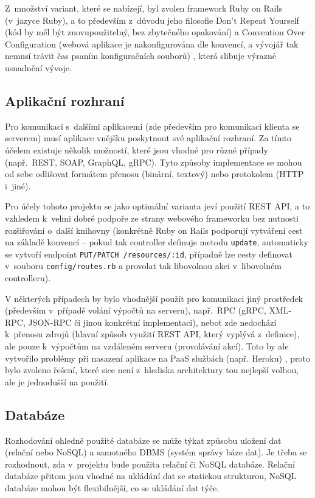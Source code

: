 \documentclass[twoside]{ctuthesis}
\begin{document}
Z~množství variant, které se nabízejí, byl zvolen framework Ruby on Rails (v~jazyce Ruby), a to především z~důvodu jeho filosofie Don't Repeat Yourself (kód by měl být znovupoužitelný, bez zbytečného opakování) a Convention Over Configuration (webová aplikace je nakonfigurována dle konvencí, a vývojář tak nemusí trávit čas psaním konfiguračních souborů) \cite{rails2020}, která slibuje výrazné usnadnění vývoje.

\subsection{Aplikační rozhraní}

Pro komunikaci s~dalšími aplikacemi (zde především pro komunikaci klienta se serverem) musí aplikace vnějšku poskytnout své aplikační rozhraní. Za tímto účelem existuje několik možností, které jsou vhodné pro různé případy (např.~REST, SOAP, GraphQL, gRPC). Tyto způsoby implementace se mohou od sebe odlišovat formátem přenosu (binární, textový) nebo protokolem (HTTP i~jiné).

Pro účely tohoto projektu se jako optimální varianta jeví použití REST API, a to vzhledem k~velmi dobré podpoře ze strany webového frameworku bez nutnosti rozšiřování o~další knihovny (konkrétně Ruby on Rails podporují vytváření cest na základě konvencí – pokud tak controller definuje metodu \texttt{update}, automaticky se vytvoří endpoint \texttt{PUT/PATCH /resources/:id}, případně lze cesty definovat v~souboru \texttt{config/routes.rb} a provolat tak libovolnou akci v~libovolném controlleru).

V některých případech by bylo vhodnější použít pro komunikaci jiný prostředek (především v~případě volání výpočtů na serveru), např.~RPC (gRPC, XML-RPC, JSON-RPC či jinou konkrétní implementaci), neboť zde nedochází k~přenosu zdrojů (hlavní způsob využití REST API, který vyplývá z~definice), ale pouze k~výpočtům na vzdáleném serveru (provolávání akcí). \cite{sturgeon2016understanding} Toto by ale vytvořilo problémy při nasazení aplikace na PaaS službách (např. Heroku) \cite{lisitsky2018does}, proto bylo zvoleno řešení, které sice není z~hlediska architektury tou nejlepší volbou, ale je jednodušší na použití.

\subsection{Databáze}

Rozhodování ohledně použité databáze se může týkat způsobu uložení dat (relační nebo NoSQL) a samotného DBMS (systém správy báze dat). Je třeba se rozhodnout, zda v~projektu bude použita relační či NoSQL databáze. Relační databáze přitom jsou vhodné na ukládání dat se statickou strukturou, NoSQL databáze mohou být flexibilnější, co se ukládání dat týče.  \cite{geeks2020difference}
\end{document}

